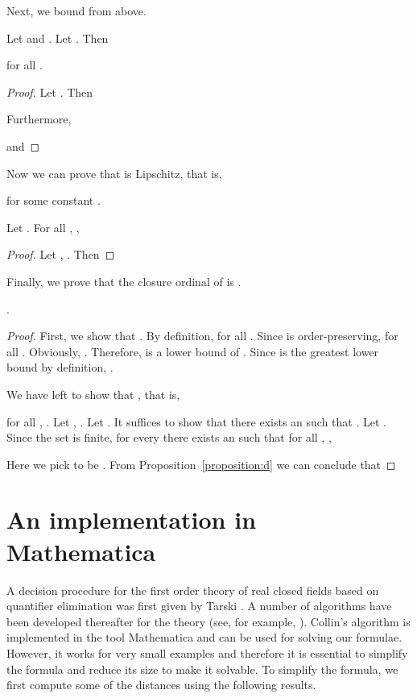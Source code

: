 \documentclass{LMCS}
\begin{document}
Next, we bound  from above.

\begin{prop}
\label{proposition:c}
Let  and .
Let .
Then

for all .
\end{prop}
\begin{proof}
Let . Then

Furthermore,

and

\end{proof}

Now we can prove that  is Lipschitz, that is,

for some constant .

\begin{prop}
\label{proposition:d}
Let .
For all , ,

\end{prop}
\begin{proof}
Let , .  Then

\end{proof}

Finally, we prove that the closure ordinal of  is .

\begin{prop}
\label{proposition:6a}
.
\end{prop}
\begin{proof}
First, we show that .
By definition,  for
all .  Since  is order-preserving,
 for all .
Obviously, .  Therefore,
 is a lower bound of .
Since  is the greatest lower bound by definition,
.

We have left to show that , that is,

for all , .  Let , .  Let .  It 
suffices to show that there exists an  such that
. 
Let .
Since the set  is finite, for every  there exists an 
such that for all , ,

Here we pick  to be .
From Proposition~\ref{proposition:d} we can conclude that

\end{proof}

\section{An implementation in Mathematica}
\label{section:8}

A decision procedure for the first order theory of real closed fields based 
on quantifier elimination was first given by Tarski \cite{T51}.  A number of 
algorithms have been developed thereafter for the theory (see, for example,
\cite{SPR96:jacm,C75:atfl,H05}).  Collin's algorithm is implemented in 
the tool Mathematica and can be used for solving our formulae.  However, it 
works for very small examples and therefore it is essential to simplify the 
formula and reduce its size to make it solvable.  To simplify the formula,
we first compute some of the distances using the following results.
\end{document}
